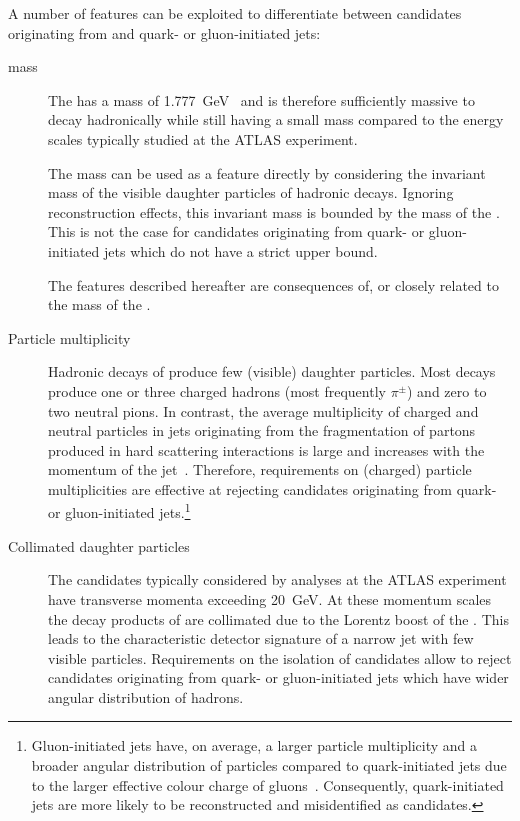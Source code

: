 A number of features can be exploited to differentiate between
\tauhadvis candidates originating from \tauhad and quark- or
gluon-initiated jets:
\begin{description}

\item[\taulepton mass] The \taulepton has a mass of
  \SI{1.777}{\GeV}~\cite{pdg2020} and is therefore sufficiently
  massive to decay hadronically while still having a small mass
  compared to the energy scales typically studied at the ATLAS
  experiment.

  The \taulepton mass can be used as a feature directly by considering
  the invariant mass of the visible daughter particles of hadronic
  \taulepton decays. Ignoring reconstruction effects, this invariant
  mass is bounded by the mass of the \taulepton. This is not the case
  for \tauhadvis candidates originating from quark- or gluon-initiated
  jets which do not have a strict upper bound.

  The features described hereafter are consequences of, or closely
  related to the mass of the \taulepton.

\item[Particle multiplicity] Hadronic decays of \tauleptons produce
  few (visible) daughter particles. Most decays produce one or three
  charged hadrons (most frequently $\pi^{\pm}$) and zero to two
  neutral pions.
  In contrast, the average multiplicity of charged and neutral
  particles in jets originating from the fragmentation of partons
  produced in hard scattering interactions is large and increases with
  the momentum of the
  jet~\cite{Ellis:1996mzs,STDM-2015-12}. Therefore, requirements on
  (charged) particle multiplicities are effective at rejecting
  \tauhadvis candidates originating from quark- or gluon-initiated
  jets.\footnote{Gluon-initiated jets have, on average, a larger
    particle multiplicity and a broader angular distribution of
    particles compared to quark-initiated jets due to the larger
    effective colour charge of
    gluons~\cite{Ellis:1996mzs}. Consequently, quark-initiated jets
    are more likely to be reconstructed and misidentified as
    \tauhadvis candidates.}

\item[Collimated daughter particles] The \tauhadvis candidates
  typically considered by analyses at the ATLAS experiment have
  transverse momenta exceeding \SI{20}{\GeV}. At these momentum scales
  the decay products of \tauleptons are collimated due to the Lorentz
  boost of the \taulepton. This leads to the characteristic detector
  signature of a narrow jet with few visible particles. Requirements
  on the isolation of \tauhadvis candidates allow to reject candidates
  originating from quark- or gluon-initiated jets which have wider
  angular distribution of hadrons.


\end{description}
